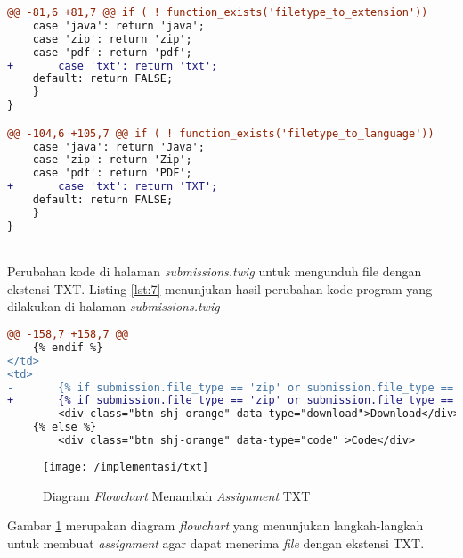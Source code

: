 \begin{lstlisting}[language=diff, caption=Perubahan kode program pada \textit{shj\_helper.php}, label=lst:6, basicstyle=\ttfamily, frame=single,
columns=fullflexible, keepspaces=true, breaklines=true]
@@ -81,6 +81,7 @@ if ( ! function_exists('filetype_to_extension'))
	case 'java': return 'java';
	case 'zip': return 'zip';
	case 'pdf': return 'pdf';
+   	case 'txt': return 'txt';
	default: return FALSE;
	}
}

@@ -104,6 +105,7 @@ if ( ! function_exists('filetype_to_language'))
	case 'java': return 'Java';
	case 'zip': return 'Zip';
	case 'pdf': return 'PDF';
+   	case 'txt': return 'TXT';
	default: return FALSE;
	}
}
\end{lstlisting}
~\\
Perubahan kode di halaman \textit{submissions.twig} untuk mengunduh file dengan ekstensi TXT. Listing \ref{lst:7} menunjukan hasil perubahan kode program yang dilakukan di halaman \textit{submissions.twig}

\begin{lstlisting}[language=diff, caption=Perubahan kode program pada halaman \textit{submission.twig}, label=lst:7, basicstyle=\ttfamily, frame=single,
columns=fullflexible, keepspaces=true, breaklines=true]
@@ -158,7 +158,7 @@
	{% endif %}
</td>
<td>
-   	{% if submission.file_type == 'zip' or submission.file_type == 'pdf' %}
+   	{% if submission.file_type == 'zip' or submission.file_type == 'pdf' or submission.file_type == 'txt' %}
		<div class="btn shj-orange" data-type="download">Download</div>
	{% else %}
		<div class="btn shj-orange" data-type="code" >Code</div>
\end{lstlisting}

\begin{figure}[H]
	\centering  
	\texttt{[image: /implementasi/txt]}  
	\caption[Diagram \textit{Flowchart} Menambah \textit{Assignment} TXT]{Diagram \textit{Flowchart} Menambah \textit{Assignment} TXT} 
	\label{fig:itxt} 
\end{figure}
Gambar \ref{fig:itxt} merupakan diagram \textit{flowchart} yang menunjukan langkah-langkah untuk membuat \textit{assignment} agar dapat menerima \textit{file} dengan ekstensi TXT.


